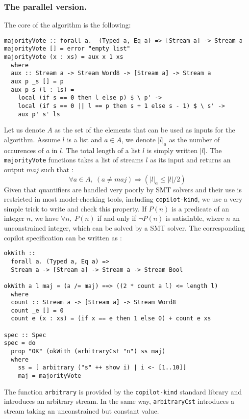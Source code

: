 \subsubsection{The parallel version.} The core of the algorithm is the
following:

\begin{lstlisting}[frame=single]
majorityVote :: forall a.  (Typed a, Eq a) => [Stream a] -> Stream a
majorityVote [] = error "empty list"
majorityVote (x : xs) = aux x 1 xs
  where
  aux :: Stream a -> Stream Word8 -> [Stream a] -> Stream a
  aux p _s [] = p
  aux p s (l : ls) =
    local (if s == 0 then l else p) $ \ p' ->
    local (if s == 0 || l == p then s + 1 else s - 1) $ \ s' ->
    aux p' s' ls
\end{lstlisting} 
Let us denote $A$ as the set of the elements that can be used as
inputs for the algorithm.  Assume $l$ is a list and $a \in A$, we
denote $|l|_a$ as the number of occurences of $a$ in $l$. The total
length of a list $l$ is simply written $|l|$. The
\texttt{majorityVote} functions takes a list of streams $l$ as its
input and returns an output $maj$ such that : \[ \forall a \in A, \;
\left( a \neq maj \right) \Longrightarrow \left(|l|_a \leq |l| /
  {2}\right) \] Given that quantifiers are handled very poorly by SMT
solvers and their use is restricted in most model-checking tools,
including \texttt{copilot-kind}, we use a very simple trick to write
and check this property.  If $P(n)$ is a predicate of an integer $n$,
we have $\forall n, \; P(n)$ if and only if $\neg P(n)$ is
satisfiable, where $n$ an unconstrained integer, which can be solved
by a SMT solver. The corresponding copilot specification can be
written as :
\begin{lstlisting}[frame=single]
okWith :: 
  forall a. (Typed a, Eq a) => 
  Stream a -> [Stream a] -> Stream a -> Stream Bool
  
okWith a l maj = (a /= maj) ==> ((2 * count a l) <= length l)
  where
  count :: Stream a -> [Stream a] -> Stream Word8
  count _e [] = 0
  count e (x : xs) = (if x == e then 1 else 0) + count e xs

spec :: Spec
spec = do
  prop "OK" (okWith (arbitraryCst "n") ss maj)
  where
    ss = [ arbitrary ("s" ++ show i) | i <- [1..10]]
    maj = majorityVote
\end{lstlisting}
The function \texttt{arbitrary} is provided by the \texttt{copilot-kind} standard library and introduces an arbitrary stream. In the same way, \texttt{arbitraryCst} introduces a stream taking an unconstrained but constant value.

